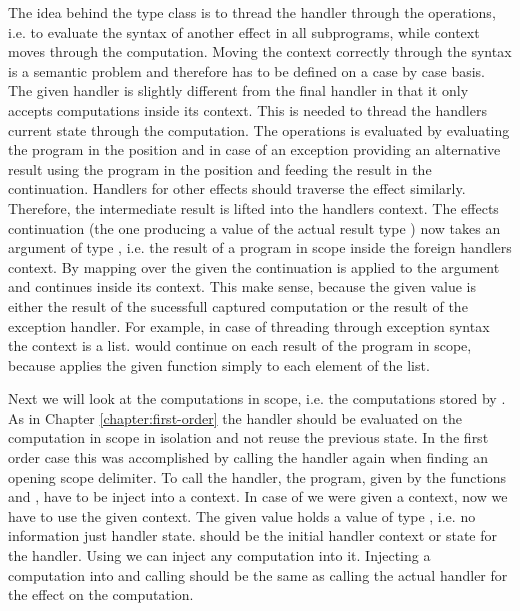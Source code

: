 The idea behind the  type class is to thread the handler
through the operations, i.e. to evaluate the syntax of another effect in all
subprograms, while context moves through the computation.
Moving the context correctly through the syntax is a semantic problem and
therefore has to be defined on a case by case basis.
The given handler  is slightly different from the final
handler in that it only accepts computations inside its context.
This is needed to thread the handlers current state through the computation.
The  operations is evaluated by evaluating the program in
the  position and in case of an exception
providing an alternative result using the program in the
 position and feeding the result in the
continuation.
Handlers for other effects should traverse the effect similarly.
Therefore, the intermediate result is lifted into the handlers context.
The effects continuation (the one producing a value of the actual result type
) now takes an argument of type , i.e. the
result of a program in scope inside the foreign handlers context.
By mapping  over the given  the continuation is
applied to the argument  and continues inside its context.
This make sense, because the given value is either the result of the sucessfull
captured computation or the result of the exception handler.
For example, in case of threading  through exception
syntax the context is a list.
 would continue on each result of the program in scope,
because \AgdaFunction{<\$>} applies the given function simply to each element of
the list.

Next we will look at the computations in scope, i.e. the computations stored by
.
As in Chapter \ref{chapter:first-order} the handler should be evaluated on the
computation in scope in isolation and not reuse the previous state.
In the first order case this was accomplished by calling the handler again when
finding an opening scope delimiter.
To call the handler, the program, given by the functions 
and , have to be inject into a context.
In case of  we were given a context, now we have to use the
given context.
The given value  holds a value of type , i.e.
no information just handler state.
 should be the initial handler context or state for the
handler.
Using \AgdaFunction{<\$} we can inject any computation into it.
Injecting a computation into  and calling 
should be the same as calling the actual handler for the effect on the
computation.

